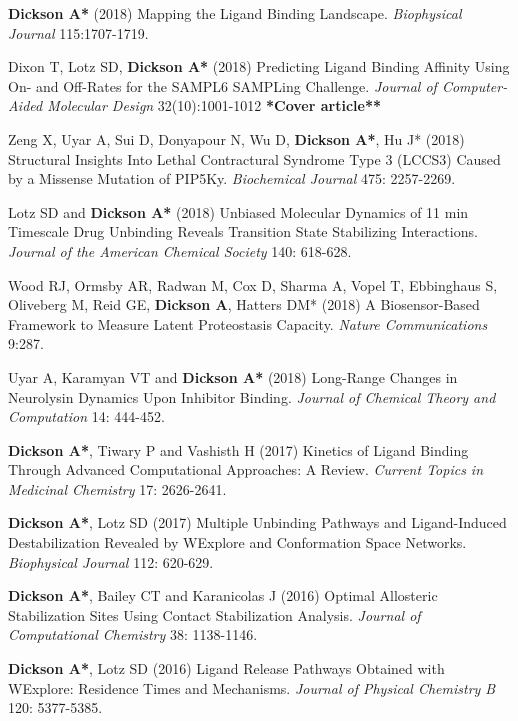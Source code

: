 \documentclass[margin,line]{res}
\begin{document}
\begin{resume}
\begin{spacing}{1.2}
\begin{thebibliography}{10}
  {\bf Dickson A*} (2018) Mapping the Ligand Binding Landscape.
  \newblock \textit{Biophysical Journal} 115:1707-1719.

  Dixon T, Lotz SD, {\bf Dickson A*} (2018)
  Predicting Ligand Binding Affinity Using On- and Off-Rates for the SAMPL6 SAMPLing Challenge.
  \newblock \textit{Journal of Computer-Aided Molecular Design} 32(10):1001-1012 {\bf **Cover article**}

  Zeng X, Uyar A, Sui D, Donyapour N, Wu D, {\bf Dickson A*}, Hu J* (2018)
  Structural Insights Into Lethal Contractural Syndrome Type 3 (LCCS3) Caused by a Missense Mutation of PIP5Ky.
  \newblock \textit{Biochemical Journal} 475: 2257-2269.

  Lotz SD and {\bf Dickson A*} (2018)
  Unbiased Molecular Dynamics of 11 min Timescale Drug Unbinding Reveals Transition State Stabilizing Interactions.
\newblock \textit{Journal of the American Chemical Society} 140: 618-628.

  Wood RJ, Ormsby AR, Radwan M, Cox D, Sharma A, Vopel T, Ebbinghaus S, Oliveberg M, Reid GE, {\bf Dickson A}, Hatters DM* (2018)
  A Biosensor-Based Framework to Measure Latent Proteostasis Capacity.
\newblock \textit{Nature Communications} 9:287.

Uyar A, Karamyan VT and {\bf Dickson A*} (2018)
Long-Range Changes in Neurolysin Dynamics Upon Inhibitor Binding.
\newblock \textit{Journal of Chemical Theory and Computation} 14: 444-452.

  {\bf Dickson A*}, Tiwary P and Vashisth H (2017)
Kinetics of Ligand Binding Through Advanced Computational Approaches: A Review.
\newblock \textit{Current Topics in Medicinal Chemistry} 17: 2626-2641.

{\bf Dickson A*}, Lotz SD (2017)
Multiple Unbinding Pathways and Ligand-Induced Destabilization Revealed by WExplore and Conformation Space Networks.
\newblock \textit{Biophysical Journal} 112: 620-629. 

{\bf Dickson A*}, Bailey CT and Karanicolas J (2016)
Optimal Allosteric Stabilization Sites Using Contact Stabilization Analysis.
\newblock \textit{Journal of Computational Chemistry} 38: 1138-1146.

{\bf Dickson A*}, Lotz SD (2016)
Ligand Release Pathways Obtained with WExplore: Residence Times and Mechanisms.
\newblock \textit{Journal of Physical Chemistry B} 120: 5377-5385. 


\end{thebibliography}
\end{spacing}
\end{resume}
\end{document}
